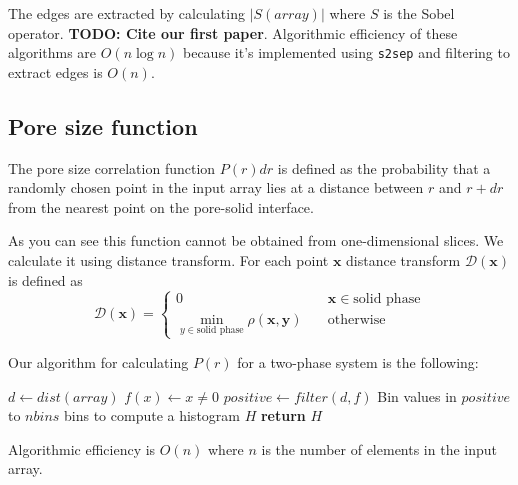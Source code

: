 \documentclass[reprint,amsmath,amssymb,aps,pre]{revtex4-1}
\newcommand{\code}[1]{\colorbox{light-gray}{\texttt{#1}}}
\begin{document}
The edges are extracted by calculating $|S(array)|$ where $S$ is the Sobel
operator. \textbf{TODO: Cite our first paper}. Algorithmic efficiency of these
algorithms are $O(n\log n)$ because it's implemented using \code{s2sep} and
filtering to extract edges is $O(n)$.

\subsection{Pore size function}
The pore size correlation function $P(r)dr$ is defined as the probability that a
randomly chosen point in the input array lies at a distance between
$r$ and $r + dr$ from the nearest point on the pore-solid interface.

As you can see this function cannot be obtained from one-dimensional slices. We
calculate it using distance transform. For each point $\bm{x}$ distance
transform $\mathcal{D}(\bm{x})$ is defined as
\begin{equation*}
  \mathcal{D}(\bm{x})= \left\{
  \begin{array}{ll}
    0 & \quad \bm{x} \in \text{solid phase} \\
    \min\limits_{y \in \text{solid phase}} \rho(\bm{x},\bm{y}) & \quad \text{otherwise}
  \end{array}
\right.
\end{equation*}

Our algorithm for calculating $P(r)$ for a two-phase system is the following:
\begin{algorithmic}[1]
    \State $d \gets dist(array)$ 
    \State $f(x) \gets x \ne 0$
    \State $positive \gets filter(d, f)$
    \State Bin values in $positive$ to $nbins$ bins to compute a histogram $H$
    \State \textbf{return} $H$
  \EndProcedure
\end{algorithmic}
Algorithmic efficiency is $O(n)$ where $n$ is the number of elements in the
input array.
\end{document}
